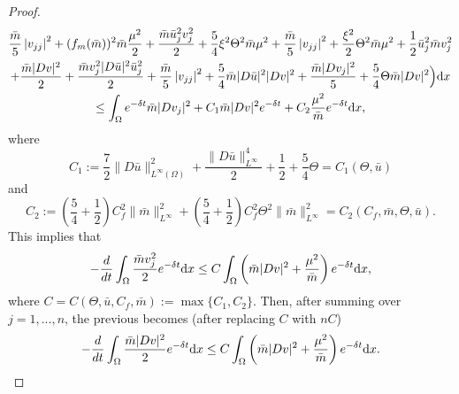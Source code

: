 \documentclass[10pt,a4paper,nouppercase,nowrite]{article}
\numberwithin{equation}{section}
\newcommand{\di}{{\rm d}}
\theoremstyle{definition}
\begin{document}
\begin{proof}
\begin{multline*}
			  \frac{\bar{m}}{5} \left| v_{jj} \right|^2 + (f_m(\bar{m}))^2 \bar{m} \frac{\mu^2}{2} + \frac{\bar{m} \bar{u}_j^2  v_j^2}{2} + \frac{5}{4} \xi^2 \Theta^2 \bar{m}\mu^2 + \frac{\bar{m}}{5} \left| v_{jj} \right|^2 + \frac{\xi^2}{2} \Theta^2 \bar{m} \mu^2 +  \frac{1}{2}\bar{u}_j^2\bar{m}v_j^2\\
			 + \frac{\bar{m}|Dv|^2}2 + \frac{\bar{m}v_j^2 |D\bar{u}|^2\bar{u}_j^2}{2} + \frac{\bar{m}}{5} \left| v_{jj} \right|^2  + \frac{5}{4} \bar{m} |D\bar{u}|^2|Dv|^2 + \frac{\bar{m}|Dv_j|^2}{5} + \frac{5}{4} \Theta \bar{m} |Dv|^2  \Big) \di x \\
			\le \int_{\Omega} e^{-\delta t} \bar{m}|Dv_j|^2 + C_1 \bar{m}|Dv|^2 e^{-\delta t} + C_2  \frac{\mu^2}{\bar{m}} e^{-\delta t} \di x,
		\end{multline*}
		where 
		\begin{equation*}
			C_1:=\frac{7}{2} \|D\bar{u}\|_{L^{\infty}(\Omega)}^2 + \frac {\|D\bar{u}\|_{L^{\infty}}^4 }{2} + \frac{1}{2} + \frac{5}{4} \Theta =C_1(\Theta,\bar{u})
		\end{equation*}
		and
		\begin{equation*}
			C_2:=\left(\frac{5}{4}+\frac12\right) C_f^2 \| \bar{m}\|_{L^{\infty}}^2  + \left(\frac{5}{4}+\frac12\right) C_f^2 \Theta^2 \|\bar{m}\|^2_{L^{\infty}}  =C_2(C_f,\bar{m},\Theta,\bar{u}).
		\end{equation*}
		This implies that
		\begin{equation*}
			-\frac{d}{dt} \int_{\Omega} \frac{\bar{m}v_j^2}{2} e^{-\delta t} \di x \le C \int_{\Omega} \left( \bar{m}|Dv|^2 + \frac{\mu^2}{\bar{m}} \right) e^{-\delta t} \di x,
		\end{equation*}
		where $C = C(\Theta,\bar{u},C_f,\bar{m}) :=\max\{ C_1,C_2 \}$. Then, after summing over $j=1,...,n$, the previous becomes (after replacing $C$ with $nC$)
		\begin{equation}
			-\frac{d}{dt} \int_{\Omega} \frac{\bar{m}|Dv|^2}{2} e^{-\delta t} \di x \le C \int_{\Omega} \left( \bar{m}|Dv|^2 + \frac{\mu^2}{\bar{m}} \right) e^{-\delta t} \di x.
			\label{mdv}
		\end{equation}
		

\end{proof}
\end{document}
